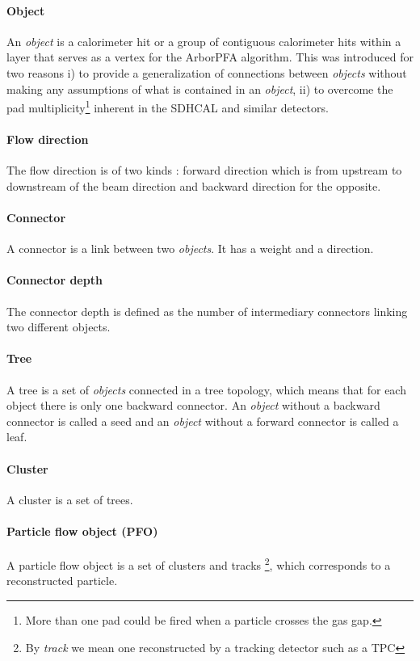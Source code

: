 \documentclass[cits]{JINST}
\begin{document}
\paragraph*{Object} An \textit{object} is a calorimeter hit or a group of contiguous calorimeter hits within a layer that serves as a vertex for the ArborPFA algorithm. This was introduced for two reasons i) to provide a generalization of connections between \textit{objects} without making any assumptions of what is contained in an \textit{object}, ii) to overcome the pad multiplicity\footnote{More than one pad could be fired when a particle crosses the gas gap.} inherent in the SDHCAL \cite{sdhcal-paper} and similar detectors.

\paragraph*{Flow direction} The flow direction is of two kinds : forward direction which is from upstream to downstream of the beam direction and backward direction for the opposite.

\paragraph*{Connector} A connector is a link between two \textit{objects}. It has a weight and a direction.

\paragraph*{Connector depth} The connector depth is defined as the number of intermediary connectors linking two different objects.

\paragraph*{Tree} A tree is a set of \textit{objects} connected in a tree topology, which means that for each object there is only one backward connector. An \textit{object} without a backward connector is called a seed and an \textit{object} without a forward connector is called a leaf.

\paragraph*{Cluster} A cluster is a set of trees.

\paragraph*{Particle flow object (PFO)} A particle flow object is a set of clusters and tracks \footnote{By \textit{track} we mean one reconstructed by a tracking detector such as a TPC}, which corresponds to a reconstructed particle.
\end{document}
